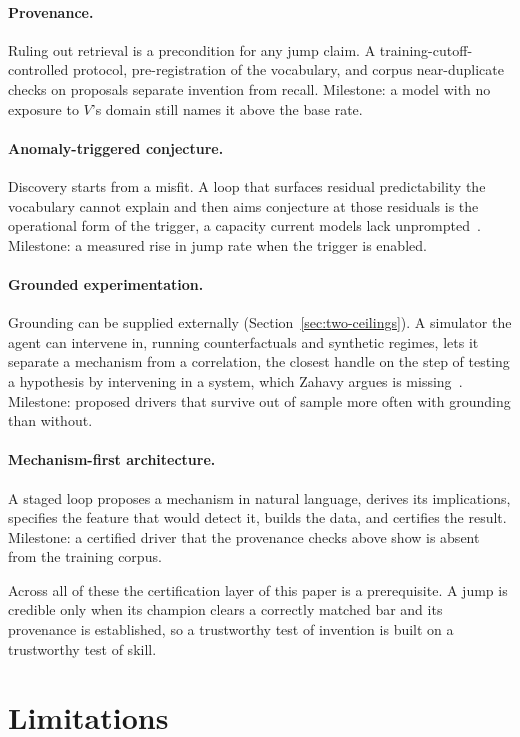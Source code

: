 \documentclass[11pt]{article}
\begin{document}
\paragraph{Provenance.} Ruling out retrieval is a precondition for any jump claim. A
training-cutoff-controlled protocol, pre-registration of the vocabulary, and corpus near-duplicate
checks on proposals separate invention from recall. Milestone: a model with no exposure to $V$'s domain
still names it above the base rate.

\paragraph{Anomaly-triggered conjecture.} Discovery starts from a misfit. A loop that surfaces residual
predictability the vocabulary cannot explain and then aims conjecture at those residuals is the
operational form of the trigger, a capacity current models lack unprompted~\cite{dingli}. Milestone: a
measured rise in jump rate when the trigger is enabled.

\paragraph{Grounded experimentation.} Grounding can be supplied externally
(Section~\ref{sec:two-ceilings}). A simulator the agent can intervene in, running counterfactuals and
synthetic regimes, lets it separate a mechanism from a correlation, the closest handle on the
step of testing a hypothesis by intervening in a system, which Zahavy argues is missing~\cite{zahavy}. Milestone: proposed drivers that
survive out of sample more often with grounding than without.

\paragraph{Mechanism-first architecture.} A staged loop proposes a mechanism in natural language,
derives its implications, specifies the feature that would detect it, builds the data, and certifies the
result. Milestone: a certified driver that the provenance checks above show is absent from the training corpus.

Across all of these the certification layer of this paper is a prerequisite. A jump is credible only
when its champion clears a correctly matched bar and its provenance is established, so a trustworthy
test of invention is built on a trustworthy test of skill.

\section{Limitations}
\label{sec:limitations}
\end{document}
